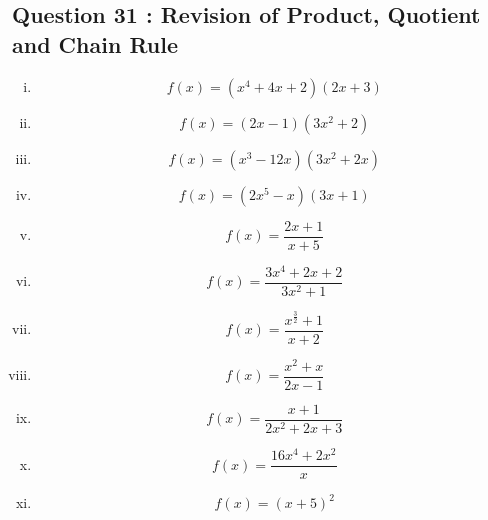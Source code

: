 \documentclass[]{article}
\begin{document}
\subsection*{Question 31 : Revision of Product, Quotient and Chain Rule}
\begin{multicols}{2}
	\begin{enumerate}[(i)]
	\item		 \[ f(x) = (x^4+4x+2)(2x+3) \,\] %
	\item		 \[ f(x) = (2x-1)(3x^2+2) \,\] %
	\item		 \[ f(x) = (x^3-12x)(3x^2+2x) \,\] %
	\item		 \[ f(x) = (2x^5-x)(3x+1) \,\] %
	\item		\[ f(x) = \frac{2x+1}{x+5} \,\] %
	\item		 \[ f(x) = \frac{3x^4+2x +2}{3x^2+1} \,\] %
	\item		 \[ f(x) = \frac{x^\frac{3}{2}+1}{x+2} \,\] %
	\item		\[ f(x) = \frac{x^2+x}{2x-1} \,\] %
	\item		 \[ f(x) = \frac{x+1}{2x^2+2x+3} \,\] %
	\item		 \[ f(x) = \frac{16x^4+2x^2}{x} \,\] %
	\item		\[ f(x) = (x+5)^2 \,\] %

\end{enumerate}
\end{multicols}
\end{document}
